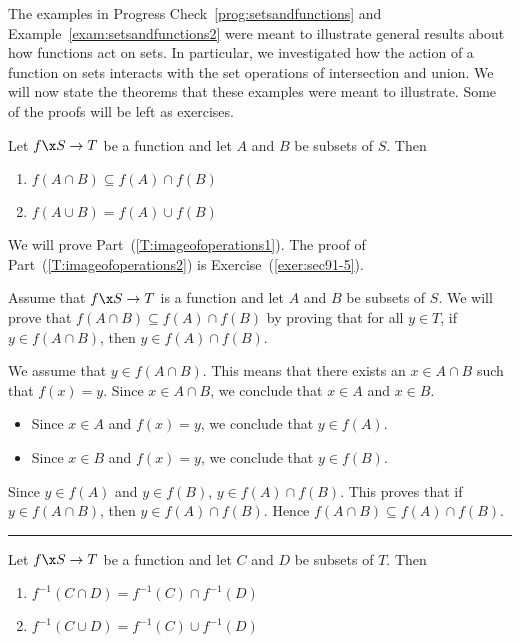 The examples in Progress Check~\ref{prog:setsandfunctions} and 
Example~\ref{exam:setsandfunctions2} were meant to illustrate general results about how functions act on sets.  In particular, we investigated how the action of a function on sets interacts with the set operations of intersection and union.  We will now state the theorems that these examples were meant to illustrate.  Some of the proofs will be left as exercises.

\begin{theorem} \label{T:imageofoperations}
Let $f\x S \to T$ be a function and let $A$ and $B$ be subsets of $S$.  Then
\begin{enumerate}
\item $f ( A \cap B ) \subseteq f ( A ) \cap f ( B )$
\label{T:imageofoperations1}
%

\item $f ( A \cup B ) = f ( A ) \cup f ( B )$
\label{T:imageofoperations2}
%
\end{enumerate}
\end{theorem}
%
\begin{myproof}
We will prove Part~(\ref{T:imageofoperations1}).  The proof of 
Part~(\ref{T:imageofoperations2}) is Exercise~(\ref{exer:sec91-5}).

Assume that $f\x S \to T$ is a function and let $A$ and $B$ be subsets of $S$.  We will prove that $f ( A \cap B ) \subseteq f ( A ) \cap f ( B )$ by proving that for all $y \in T$, if $y \in f ( A \cap B )$, then 
$y \in f ( A ) \cap f ( B )$.

We assume that $y \in f ( A \cap B )$.  This means that there exists an 
$x \in A \cap B$ such that $f ( x ) = y$.  Since $x \in A \cap B$, we conclude that 
$x \in A$ and $x \in B$.

\begin{itemize}
\item Since $x \in A$ and $f ( x ) = y$, we conclude that $y \in f ( A )$.

\item Since $x \in B$ and $f ( x ) = y$, we conclude that $y \in f ( B )$.
\end{itemize}
Since $y \in f ( A )$ and $y \in f ( B )$,  
$y \in f ( A ) \cap f ( B )$.  This proves that if 
$y \in f ( A \cap B )$, then $y \in f ( A ) \cap f ( B )$.  Hence $f ( A \cap B ) \subseteq f ( A ) \cap f ( B )$.
\end{myproof}
\hrule
%
\begin{theorem} \label{T:invimageofoperations}
Let $f\x S \to T$ be a function and let $C$ and $D$ be subsets of $T$.  Then
\begin{enumerate}
\item $f^{-1} ( C \cap D ) = f^{-1} ( C ) \cap f^{-1} ( D )$
\label{T:invimageofoperations1}
%

\item $f^{-1} ( C \cup D ) = f^{-1} ( C ) \cup f^{-1} ( D )$
\label{T:invimageofoperations2}
%
\end{enumerate}
\end{theorem}
